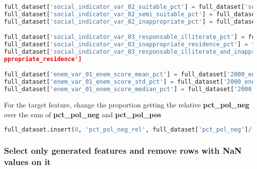 \begin{lstlisting}[language=Python]
full_dataset['social_indicator_var_02_suitable_pct'] = full_dataset['social_indicator_var_02_2000_suitable'] / full_dataset['social_indicator_var_02_2010_suitable']
full_dataset['social_indicator_var_02_semi_suitable_pct'] = full_dataset['social_indicator_var_02_2000_semi_suitable'] / full_dataset['social_indicator_var_02_2010_semi_suitable']
full_dataset['social_indicator_var_02_inappropriate_pct'] = full_dataset['social_indicator_var_02_2000_inappropriate'] / full_dataset['social_indicator_var_02_2010_inappropriate']

full_dataset['social_indicator_var_03_responsable_illiterate_pct'] = full_dataset['social_indicator_var_03_2000_responsable_illiterate'] / full_dataset['social_indicator_var_03_2010_responsable_illiterate']
full_dataset['social_indicator_var_03_inappropriate_residence_pct'] = full_dataset['social_indicator_var_03_2000_inappropriate_residence'] / full_dataset['social_indicator_var_03_2010_inappropriate_residence']
full_dataset['social_indicator_var_03_responsable_illiterate_and_inapprop riate_residence_pct'] = full_dataset['social_indicator_var_03_2000_responsable_illiterate_and_ina ppropriate_residence'] / full_dataset['social_indicator_var_03_2010_responsable_illiterate_and_ina
ppropriate_residence']

full_dataset['enem_var_01_enem_score_mean_pct'] = full_dataset['2000_enem_var_01_enem_score_mean'] / full_dataset['2010_enem_var_01_enem_score_mean']
full_dataset['enem_var_01_enem_score_std_pct'] = full_dataset['2000_enem_var_01_enem_score_std'] / full_dataset['2010_enem_var_01_enem_score_std']
full_dataset['enem_var_01_enem_score_median_pct'] = full_dataset['2000_enem_var_01_enem_score_median'] / full_dataset['2010_enem_var_01_enem_score_median']
\end{lstlisting}

For the target feature, change the proportion getting the relative
\textbf{pct\_pol\_neg} over the sum of \textbf{pct\_pol\_neg} and
\textbf{pct\_pol\_pos}

\begin{lstlisting}[language=Python]
full_dataset.insert(0, 'pct_pol_neg_rel', full_dataset['pct_pol_neg']/(full_dataset['pct_pol_neg']+full_dataset['pct_pol_pos']))
\end{lstlisting}

\hypertarget{select-only-generated-features-and-remove-rows-with-nan-values-on-it}{%
\subsubsection{Select only generated features and remove rows with NaN
values on
it}\label{select-only-generated-features-and-remove-rows-with-nan-values-on-it}}

